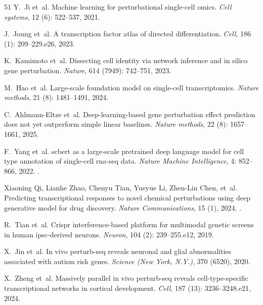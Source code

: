\documentclass[10pt]{article}
\begin{document}
\begin{thebibliography}{51}
Y.~Ji et~al.
\newblock Machine learning for perturbational single-cell omics.
\newblock \emph{Cell systems}, 12 (6): 522--537, 2021.

J.~Joung et~al.
\newblock A transcription factor atlas of directed differentiation.
\newblock \emph{Cell}, 186 (1): 209--229.e26, 2023.

K.~Kamimoto et~al.
\newblock Dissecting cell identity via network inference and in silico gene
  perturbation.
\newblock \emph{Nature}, 614 (7949): 742--751, 2023.

M.~Hao et~al.
\newblock Large-scale foundation model on single-cell transcriptomics.
\newblock \emph{Nature methods}, 21 (8): 1481--1491, 2024.

C.~Ahlmann-Eltze et~al.
\newblock Deep-learning-based gene perturbation effect prediction does not yet
  outperform simple linear baselines.
\newblock \emph{Nature methods}, 22 (8): 1657--1661, 2025.

F.~Yang et~al.
\newblock scbert as a large-scale pretrained deep language model for cell type
  annotation of single-cell rna-seq data.
\newblock \emph{Nature Machine Intelligence}, 4: 852--866, 2022.
\newblock {}.

Xiaoning Qi, Lianhe Zhao, Chenyu Tian, Yueyue Li, Zhen-Lin Chen, et~al.
\newblock Predicting transcriptional responses to novel chemical perturbations
  using deep generative model for drug discovery.
\newblock \emph{Nature Communications}, 15 (1), 2024.
\newblock {}.

R.~Tian et~al.
\newblock Crispr interference-based platform for multimodal genetic screens in
  human ipsc-derived neurons.
\newblock \emph{Neuron}, 104 (2): 239--255.e12, 2019.

X.~Jin et~al.
\newblock In vivo perturb-seq reveals neuronal and glial abnormalities
  associated with autism risk genes.
\newblock \emph{Science (New York, N.Y.)}, 370 (6520), 2020.

X.~Zheng et~al.
\newblock Massively parallel in vivo perturb-seq reveals cell-type-specific
  transcriptional networks in cortical development.
\newblock \emph{Cell}, 187 (13): 3236--3248.e21, 2024.


\end{thebibliography}
\end{document}
